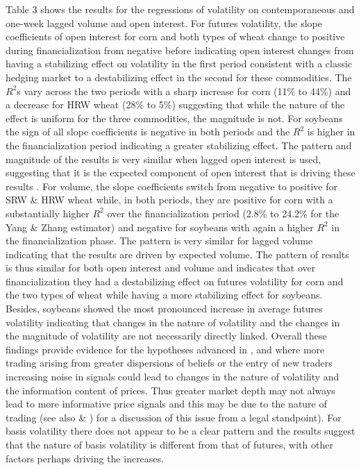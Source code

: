 \documentclass[
]{book}
\begin{document}
Table 3 shows the results for the regressions of volatility on contemporaneous and one-week lagged volume and open interest. For futures volatility, the slope coefficients of open interest for corn and both types of wheat change to positive during financialization from negative before indicating open interest changes from having a stabilizing effect on volatility in the first period consistent with a classic hedging market \citep{working_speculation_1960, working_new_1962} to a destabilizing effect in the second for these commodities. The \(R^{2}\)s vary across the two periods with a sharp increase for corn (11\% to 44\%) and a decrease for HRW wheat (28\% to 5\%) suggesting that while the nature of the effect is uniform for the three commodities, the magnitude is not. For soybeans the sign of all slope coefficients is negative in both periods and the \(R^{2}\) is higher in the financialization period indicating a greater stabilizing effect. The pattern and magnitude of the results is very similar when lagged open interest is used, suggesting that it is the expected component of open interest that is driving these results \citep{bessembinder_price_1993}. For volume, the slope coefficients switch from negative to positive for SRW \& HRW wheat while, in both periods, they are positive for corn with a substantially higher \(R^{2}\) over the financialization period (2.8\% to 24.2\% for the Yang \& Zhang estimator) and negative for soybeans with again a higher \(R^{2}\) in the financialization phase. The pattern is very similar for lagged volume indicating that the results are driven by expected volume. The pattern of results is thus similar for both open interest and volume and indicates that over financialization they had a destabilizing effect on futures volatility for corn and the two types of wheat while having a more stabilizing effect for soybeans. Besides, soybeans showed the most pronounced increase in average futures volatility indicating that changes in the nature of volatility and the changes in the magnitude of volatility are not necessarily directly linked.
Overall these findings provide evidence for the hypotheses advanced in \citet{goldstein_speculation_2014}, \citet{singleton_investor_2013} and \citet{stein_informational_1987} where more trading arising from greater dispersions of beliefs or the entry of new traders increasing noise in signals could lead to changes in the nature of volatility and the information content of prices. Thus greater market depth may not always lead to more informative price signals and this may be due to the nature of trading (see also \citet{stout_why_1998} \& \citet{stout_uncertainty_2011}) for a discussion of this issue from a legal standpoint).
For basis volatility there does not appear to be a clear pattern and the results suggest that the nature of basis volatility is different from that of futures, with other factors perhaps driving the increases.
\end{document}
